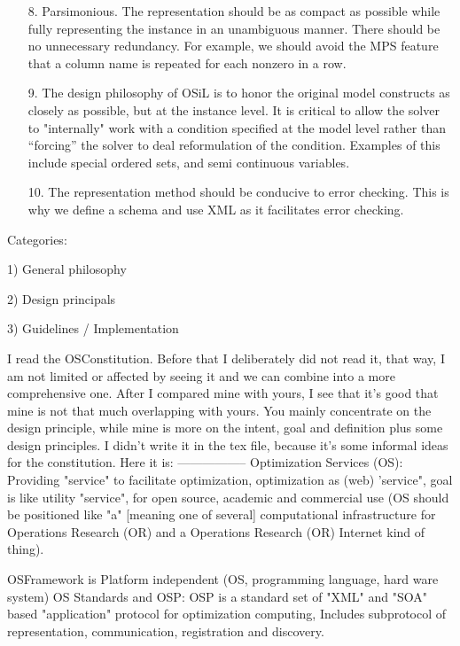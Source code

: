 \documentclass[11pt]{amsart}
\begin{document}
\begin{itemize}
\item[8.]  Parsimonious. The representation should be as compact as possible while fully representing the instance in an unambiguous manner.  There should be no unnecessary redundancy. For example, we should avoid the MPS feature that a column name is repeated for each nonzero in a row.

\item[9.]  The design philosophy of OSiL is to honor the original model constructs as closely as possible, but at the instance level.  It is critical to  allow the solver to "internally"  work with a  condition specified at the model level  rather than ``forcing'' the solver to  deal reformulation of the condition. Examples of this include special ordered sets, and semi continuous variables.  

\item[10.] The representation method should be conducive to error checking. This is why we define a schema and use XML as it facilitates error checking. 



\end{itemize}

Categories:

1) General philosophy

2) Design principals 

3) Guidelines / Implementation



I read the OSConstitution.
Before that I deliberately did not read it, that way, I am not limited or affected by seeing it and we can combine into a more comprehensive one.
After I compared mine with yours, I see that it's good that mine is not that much overlapping with yours.
You mainly concentrate on the design principle, while mine is more on the intent, goal and definition plus some design principles.
I didn't write it in the tex file, because it's some informal ideas for the constitution.
Here it is:
-----------------
Optimization Services (OS): Providing "service" to facilitate optimization, optimization as (web) 'service", goal is like utility "service", for open source, academic and commercial use
(OS should be positioned like "a" [meaning one of several] computational infrastructure for Operations Research (OR) and a Operations Research (OR) Internet kind of thing).


OSFramework is Platform independent (OS, programming language, hard ware system)
OS Standards and OSP: OSP is a standard set of "XML" and "SOA" based "application" protocol for optimization computing,
    Includes subprotocol of representation, communication, registration and discovery.
\end{document}
